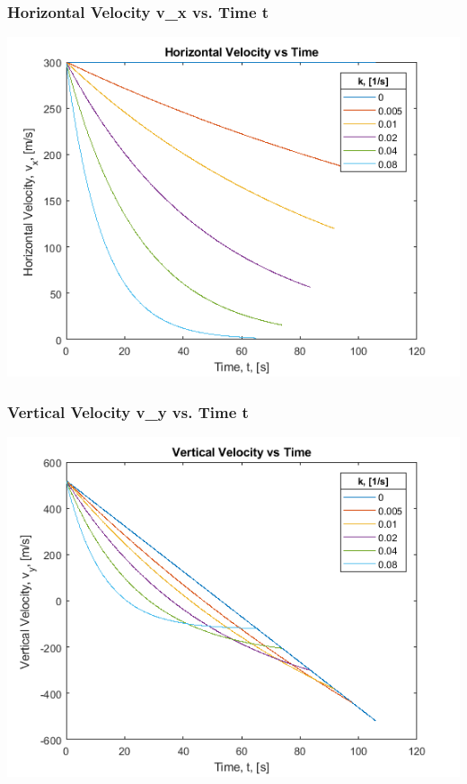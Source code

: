\documentclass[oneside]{article}
\begin{document}
\subsubsection{Horizontal Velocity v\_x vs. Time t}
\includegraphics [width=\linewidth]{graph_u-t.png}
\subsubsection{Vertical Velocity v\_y vs. Time t}
\includegraphics [width=\linewidth]{graph_v-t.png}
\end{document}
